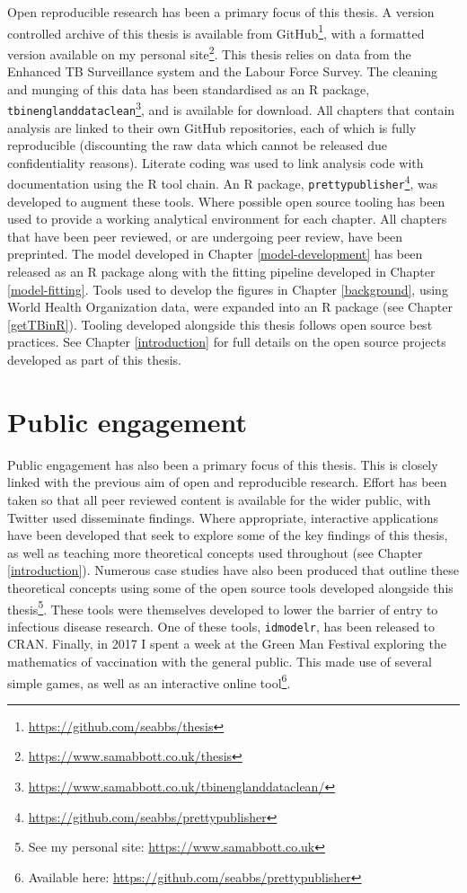 \documentclass[11pt,twoside]{bristolthesis}
\begin{document}
  Open reproducible research has been a primary focus of this thesis. A version controlled archive of this thesis is available from GitHub\footnote{\url{https://github.com/seabbs/thesis}}, with a formatted version available on my personal site\footnote{\url{https://www.samabbott.co.uk/thesis}}. This thesis relies on data from the Enhanced TB Surveillance system and the Labour Force Survey. The cleaning and munging of this data has been standardised as an R package, \texttt{tbinenglanddataclean}\footnote{\url{https://www.samabbott.co.uk/tbinenglanddataclean/}}, and is available for download. All chapters that contain analysis are linked to their own GitHub repositories, each of which is fully reproducible (discounting the raw data which cannot be released due confidentiality reasons). Literate coding was used to link analysis code with documentation using the R tool chain. An R package, \texttt{prettypublisher}\footnote{\url{https://github.com/seabbs/prettypublisher}}, was developed to augment these tools. Where possible open source tooling has been used to provide a working analytical environment for each chapter. All chapters that have been peer reviewed, or are undergoing peer review, have been preprinted. The model developed in Chapter \ref{model-development} has been released as an R package along with the fitting pipeline developed in Chapter \ref{model-fitting}. Tools used to develop the figures in Chapter \ref{background}, using World Health Organization data, were expanded into an R package (see Chapter \ref{getTBinR}). Tooling developed alongside this thesis follows open source best practices. See Chapter \ref{introduction} for full details on the open source projects developed as part of this thesis.
  
  \hypertarget{public-engagement}{%
  \section{Public engagement}\label{public-engagement}}
  
  Public engagement has also been a primary focus of this thesis. This is closely linked with the previous aim of open and reproducible research. Effort has been taken so that all peer reviewed content is available for the wider public, with Twitter used disseminate findings. Where appropriate, interactive applications have been developed that seek to explore some of the key findings of this thesis, as well as teaching more theoretical concepts used throughout (see Chapter \ref{introduction}). Numerous case studies have also been produced that outline these theoretical concepts using some of the open source tools developed alongside this thesis\footnote{See my personal site: \url{https://www.samabbott.co.uk}}. These tools were themselves developed to lower the barrier of entry to infectious disease research. One of these tools, \texttt{idmodelr}, has been released to CRAN. Finally, in 2017 I spent a week at the Green Man Festival exploring the mathematics of vaccination with the general public. This made use of several simple games, as well as an interactive online tool\footnote{Available here: \url{https://github.com/seabbs/prettypublisher}}.
  
\end{document}
